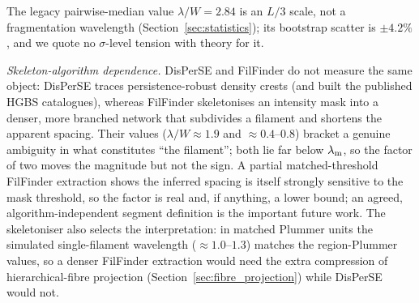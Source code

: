 \documentclass[usenatbib,twoside,twocolumn]{mnras}
\begin{document}
The legacy pairwise-median value $\lambda/W=2.84$ is an $L/3$ scale, not a fragmentation wavelength (Section~\ref{sec:statistics}); its bootstrap scatter is $\pm4.2\%$, and we quote no $\sigma$-level tension with theory for it.

\emph{Skeleton-algorithm dependence.} DisPerSE and FilFinder do not measure the same object: DisPerSE traces persistence-robust density crests (and built the published HGBS catalogues), whereas FilFinder skeletonises an intensity mask into a denser, more branched network that subdivides a filament and shortens the apparent spacing. Their values ($\lambda/W\approx1.9$ and $\approx0.4$--$0.8$) bracket a genuine ambiguity in what constitutes ``the filament''; both lie far below $\lambda_{\rm m}$, so the factor of two moves the magnitude but not the sign. A partial matched-threshold FilFinder extraction shows the inferred spacing is itself strongly sensitive to the mask threshold, so the factor is real and, if anything, a lower bound; an agreed, algorithm-independent segment definition is the important future work. The skeletoniser also selects the interpretation: in matched Plummer units the simulated single-filament wavelength ($\approx1.0$--$1.3$) matches the region-Plummer values, so a denser FilFinder extraction would need the extra compression of hierarchical-fibre projection (Section~\ref{sec:fibre_projection}) while DisPerSE would not.
\end{document}
